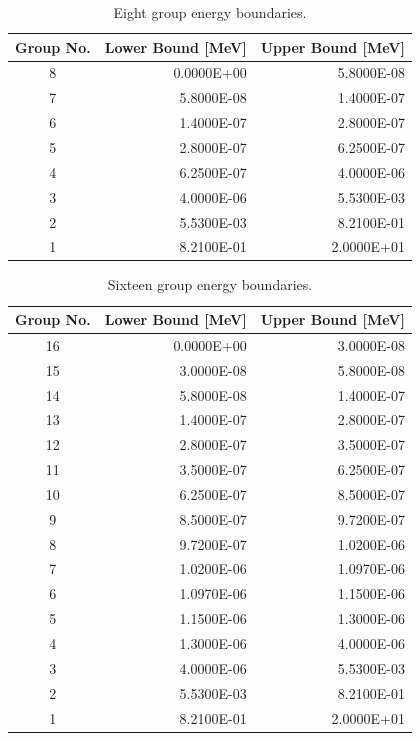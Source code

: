 \begin{appendices}
\begin{table}[h!]
  \centering
  \footnotesize
  \caption{Eight group energy boundaries.}
  \label{table:app-8-groups} 
  \vspace{14pt}
  \begin{tabular}{c r r}
    \toprule
    {\bf Group No.} &
    {\bf Lower Bound [MeV]} &
    {\bf Upper Bound [MeV]} \\
    \midrule
8 & 0.0000E+00 & 5.8000E-08 \\
7 & 5.8000E-08 & 1.4000E-07 \\
6 & 1.4000E-07 & 2.8000E-07 \\
5 & 2.8000E-07 & 6.2500E-07 \\
4 & 6.2500E-07 & 4.0000E-06 \\
3 & 4.0000E-06 & 5.5300E-03 \\
2 & 5.5300E-03 & 8.2100E-01 \\
1 & 8.2100E-01 & 2.0000E+01 \\
  \bottomrule
 \end{tabular}
\end{table}

\begin{table}[h!]
  \centering
  \footnotesize
  \caption{Sixteen group energy boundaries.}
  \label{table:app-16-groups} 
  \vspace{14pt}
  \begin{tabular}{c r r}
    \toprule
    {\bf Group No.} &
    {\bf Lower Bound [MeV]} &
    {\bf Upper Bound [MeV]} \\
    \midrule
16 & 0.0000E+00 & 3.0000E-08 \\
15 & 3.0000E-08 & 5.8000E-08 \\
14 & 5.8000E-08 & 1.4000E-07 \\
13 & 1.4000E-07 & 2.8000E-07 \\
12 & 2.8000E-07 & 3.5000E-07 \\
11 & 3.5000E-07 & 6.2500E-07 \\
10 & 6.2500E-07 & 8.5000E-07 \\
9 & 8.5000E-07 & 9.7200E-07 \\
8 & 9.7200E-07 & 1.0200E-06 \\
7 & 1.0200E-06 & 1.0970E-06 \\
6 & 1.0970E-06 & 1.1500E-06 \\
5 & 1.1500E-06 & 1.3000E-06 \\
4 & 1.3000E-06 & 4.0000E-06 \\
3 & 4.0000E-06 & 5.5300E-03 \\
2 & 5.5300E-03 & 8.2100E-01 \\
1 & 8.2100E-01 & 2.0000E+01 \\
  \bottomrule
 \end{tabular}
\end{table}


\end{appendices}

